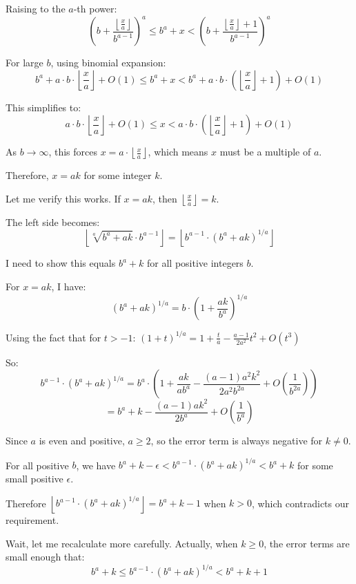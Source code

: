 \documentclass[12pt,a4paper]{article}
\theoremstyle{definition}
\begin{document}
    Raising to the $a$-th power:
    $$\left(b + \frac{\left\lfloor \frac{x}{a} \right\rfloor}{b^{a-1}}\right)^a \leq b^a + x < \left(b + \frac{\left\lfloor \frac{x}{a} \right\rfloor + 1}{b^{a-1}}\right)^a$$

    For large $b$, using binomial expansion:
    $$b^a + a \cdot b \cdot \left\lfloor \frac{x}{a} \right\rfloor + O(1) \leq b^a + x < b^a + a \cdot b \cdot \left(\left\lfloor \frac{x}{a} \right\rfloor + 1\right) + O(1)$$

    This simplifies to:
    $$a \cdot b \cdot \left\lfloor \frac{x}{a} \right\rfloor + O(1) \leq x < a \cdot b \cdot \left(\left\lfloor \frac{x}{a} \right\rfloor + 1\right) + O(1)$$

    As $b \to \infty$, this forces $x = a \cdot \left\lfloor \frac{x}{a} \right\rfloor$, which means $x$ must be a multiple of $a$.

    Therefore, $x = ak$ for some integer $k$.

    Let me verify this works. If $x = ak$, then $\left\lfloor \frac{x}{a} \right\rfloor = k$.

    The left side becomes:
    $$\left\lfloor \sqrt[a]{b^a + ak} \cdot b^{a-1} \right\rfloor = \left\lfloor b^{a-1} \cdot (b^a + ak)^{1/a} \right\rfloor$$

    I need to show this equals $b^a + k$ for all positive integers $b$.

    For $x = ak$, I have:
    $$(b^a + ak)^{1/a} = b \cdot \left(1 + \frac{ak}{b^a}\right)^{1/a}$$

    Using the fact that for $t > -1$: $(1+t)^{1/a} = 1 + \frac{t}{a} - \frac{a-1}{2a^2}t^2 + O(t^3)$

    So:
    $$b^{a-1} \cdot (b^a + ak)^{1/a} = b^a \cdot \left(1 + \frac{ak}{ab^a} - \frac{(a-1)a^2k^2}{2a^2b^{2a}} + O\left(\frac{1}{b^{2a}}\right)\right)$$
    $$= b^a + k - \frac{(a-1)ak^2}{2b^a} + O\left(\frac{1}{b^a}\right)$$

    Since $a$ is even and positive, $a \geq 2$, so the error term is always negative for $k \neq 0$.

    For all positive $b$, we have $b^a + k - \epsilon < b^{a-1} \cdot (b^a + ak)^{1/a} < b^a + k$ for some small positive $\epsilon$.

    Therefore $\left\lfloor b^{a-1} \cdot (b^a + ak)^{1/a} \right\rfloor = b^a + k - 1$ when $k > 0$, which contradicts our requirement.

    Wait, let me recalculate more carefully. Actually, when $k \geq 0$, the error terms are small enough that:
    $$b^a + k \leq b^{a-1} \cdot (b^a + ak)^{1/a} < b^a + k + 1$$
\end{document}
